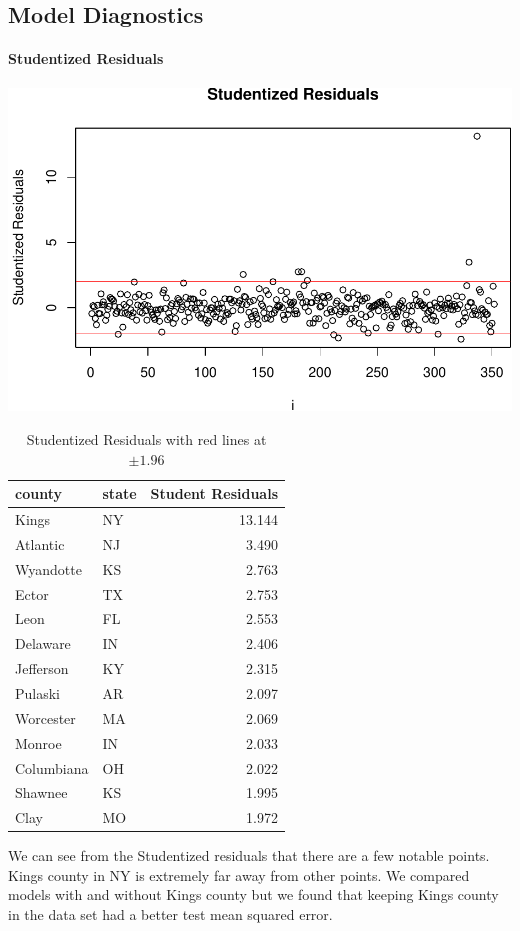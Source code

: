 \documentclass[]{article}
\let\oldparagraph\paragraph
\renewcommand{\paragraph}[1]{\oldparagraph{#1}\mbox{}}
\begin{document}
\pagebreak
\subsection{Model Diagnostics}\label{model-diagnostics}

\paragraph{Studentized Residuals}\label{studentized-residuals}

\includegraphics{project_files/figure-latex/unnamed-chunk-20-1.pdf}

\begin{longtable}[]{@{}llr@{}}
\caption{Studentized Residuals with red lines at $\pm 1.96$}\tabularnewline
\toprule
county & state & Student Residuals\tabularnewline
\midrule
\endhead
Kings & NY & 13.144\tabularnewline
Atlantic & NJ & 3.490\tabularnewline
Wyandotte & KS & 2.763\tabularnewline
Ector & TX & 2.753\tabularnewline
Leon & FL & 2.553\tabularnewline
Delaware & IN & 2.406\tabularnewline
Jefferson & KY & 2.315\tabularnewline
Pulaski & AR & 2.097\tabularnewline
Worcester & MA & 2.069\tabularnewline
Monroe & IN & 2.033\tabularnewline
Columbiana & OH & 2.022\tabularnewline
Shawnee & KS & 1.995\tabularnewline
Clay & MO & 1.972\tabularnewline
\bottomrule
\end{longtable}

We can see from the Studentized residuals that there are a few notable
points. Kings county in NY is extremely far away from other points. We
compared models with and without Kings county but we found that keeping
Kings county in the data set had a better test mean squared error.
\end{document}
